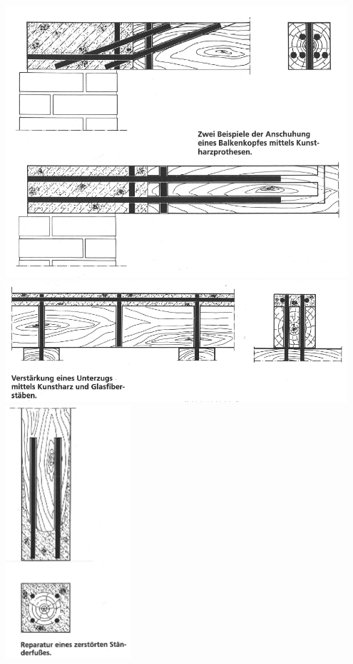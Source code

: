 \documentclass[fleqn,twoside]{article}
\begin{document}
            \begin{minipage}{0.5\textwidth}
                \includegraphics[width=0.95\textwidth]{Grafiken/Denkmalpflegerische Arbeit/Prothesen/Prothesen 1.png}\\
                \includegraphics[width=0.95\textwidth]{Grafiken/Denkmalpflegerische Arbeit/Prothesen/Prothesen 2.png}\\
                \includegraphics[width=0.35\textwidth]{Grafiken/Denkmalpflegerische Arbeit/Prothesen/Prothesen 3.png}

\end{minipage}
\end{document}
